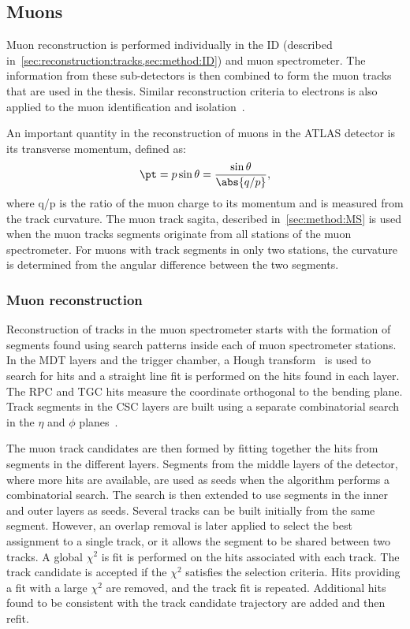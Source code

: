 \subsection{Muons}\label{sec:reconstruction:muons}
Muon reconstruction is performed individually in the ID (described in~\cref{sec:reconstruction:tracks,sec:method:ID}) and muon spectrometer. The information from these sub-detectors is then combined to form the muon tracks that are used in the thesis. Similar reconstruction criteria to electrons is also applied to the muon identification and isolation~\cite{Aad:2016jkr}. 

An important quantity in the reconstruction of muons in the ATLAS detector is its transverse momentum, defined as: 
\begin{equation}
    \pt = p\sin\theta = \frac{\sin\theta}{\abs{q/p}},
\end{equation}
where q/p is the ratio of the muon charge to its momentum and is measured from the track curvature. The muon track sagita, described in~\cref{sec:method:MS} is used when the muon tracks segments originate from all stations of the muon spectrometer. For muons with track segments in only two stations, the curvature is determined from the angular difference between the two segments. 

\subsubsection{Muon reconstruction}
Reconstruction of tracks in the muon spectrometer starts with the formation of segments found using search patterns inside each of muon spectrometer stations. In the MDT layers and the trigger chamber, a Hough transform~\cite{HoughTransform} is used to search for hits and a straight line fit is performed on the hits found in each layer. The RPC and TGC hits measure the coordinate orthogonal to the bending plane. Track segments in the CSC layers are built using a separate combinatorial search in the $\eta$ and $\phi$ planes~\cite{Aad:2016jkr}. 

The muon track candidates are then formed by fitting together the hits from segments in the different layers. Segments from the middle layers of the detector, where more hits are available, are used as seeds when the algorithm performs a combinatorial search. The search is then extended to use segments in the inner and outer layers as seeds. Several tracks can be built initially from the same segment. However, an overlap removal is later applied to select the best assignment to a single track, or it allows the segment to be shared between two tracks. A global $\chi^2$ is fit is performed on the hits associated with each track. The track candidate is accepted if the $\chi^2$ satisfies the selection criteria. Hits providing a fit with a large $\chi^2$ are removed, and the track fit is repeated. Additional hits found to be consistent with the track candidate trajectory are added and then refit. 


